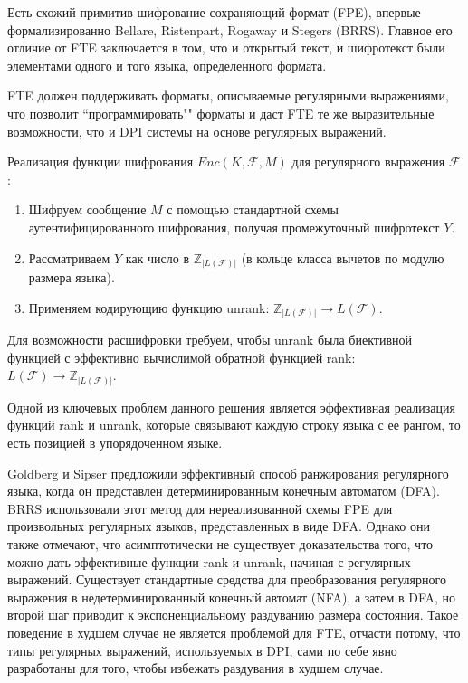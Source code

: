 Есть схожий примитив шифрование сохраняющий формат (FPE), впервые формализированно Bellare, Ristenpart, Rogaway и Stegers (BRRS).
Главное его отличие от FTE заключается в том, что и открытый текст, и шифротекст были элементами одного и того языка, определенного формата.

FTE должен поддерживать форматы, описываемые регулярными выражениями,
что позволит ``программировать"" форматы и даст FTE те же выразительные возможности, что и DPI системы на основе регулярных выражений.

Реализация функции шифрования $Enc(K, \mathcal{F}, M)$ для регулярного выражения $\mathcal{F}$:

\begin{enumerate}
    \item Шифруем сообщение $M$ с помощью стандартной схемы аутентифицированного шифрования, получая промежуточный шифротекст $Y$.
    \item Рассматриваем $Y$ как число в $\mathbb{Z}_{|L(\mathcal{F})|}$ (в кольце класса вычетов по модулю размера языка).
    \item Применяем кодирующию функцию unrank: $\mathbb{Z}_{|L(\mathcal{F})|} \rightarrow L(\mathcal{F})$.
\end{enumerate}


Для возможности расшифровки требуем, чтобы unrank была биективной функцией с эффективно вычислимой обратной функцией rank:
$L(\mathcal{F}) \rightarrow \mathbb{Z}_{|L(\mathcal{F})|}$.


Одной из ключевых проблем данного решения является эффективная реализация функций rank и unrank,
которые связывают каждую строку языка с ее рангом, то есть позицией в упорядоченном языке.

Goldberg и Sipser предложили эффективный способ ранжирования регулярного языка, когда он представлен детерминированным конечным автоматом (DFA).
BRRS использовали этот метод для нереализованной схемы FPE для произвольных регулярных языков, представленных в виде DFA.
Однако они также отмечают, что асимптотически не существует доказательства того, что можно дать эффективные функции rank и unrank, начиная с регулярных выражений.
Существует стандартные средства для преобразования регулярного выражения в недетерминированный конечный автомат (NFA),
а затем в DFA, но второй шаг приводит к экспоненциальному раздуванию размера состояния.
Такое поведение в худшем случае не является проблемой для FTE, отчасти потому,
что типы регулярных выражений, используемых в DPI, сами по себе явно разработаны для того, чтобы избежать раздувания в худшем случае.

